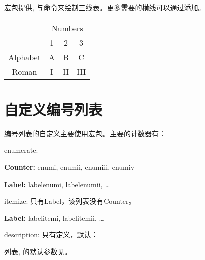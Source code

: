 宏包提供, 与命令来绘制三线表。更多需要的横线可以通过添加。

\begin{codeshow}
\begin{tabular}{cccc}
\toprule
& \multicolumn{3}{c}{Numbers} \\
\cmidrule{2-4}
& 1 & 2 & 3 \\
\midrule
Alphabet & A & B & C \\
Roman & I & II& III \\
\bottomrule
\end{tabular}
\end{codeshow}

\section{自定义编号列表}
\label{sec:list}
编号列表的自定义主要使用宏包。主要的计数器有：
\begin{feai}
\item enumerate:
  \begin{feai}
    \item \textbf{Counter:} enumi, enumii, enumiii, enumiv
    \item \textbf{Label:} labelenumi, labelenumii, \ldots
  \end{feai}
\item itemize: 只有Label，该列表没有Counter。 
  \begin{feai}
    \item \textbf{Label:} labelitemi, labelitemii, \ldots
  \end{feai}
\item description: 只有定义，默认：
\begin{latex}
\newcommand*{\descriptionlabel}[1]{\hspace\labelsep
    \normalfont\bfseries #1} %
\end{latex}
\end{feai}

列表, 的默认参数见。

